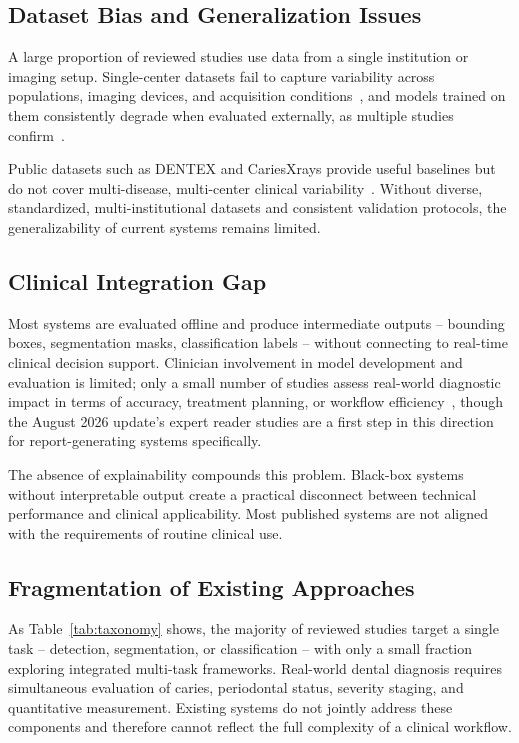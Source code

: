 \documentclass[conference]{IEEEtran}
\begin{document}
\subsection{Dataset Bias and Generalization Issues}

A large proportion of reviewed studies use data from a single
institution or imaging setup. Single-center datasets fail to capture
variability across populations, imaging devices, and acquisition
conditions~\cite{albano2024artificial,luke2025accuracy}, and models
trained on them consistently degrade when evaluated externally, as
multiple studies confirm~\cite{muresanu2024automating}.

Public datasets such as DENTEX and CariesXrays provide useful baselines
but do not cover multi-disease, multi-center clinical
variability~\cite{nassiri2025yolo,chen2024cariesxrays}. Without diverse,
standardized, multi-institutional datasets and consistent validation
protocols, the generalizability of current systems remains limited.

\subsection{Clinical Integration Gap}

Most systems are evaluated offline and produce intermediate outputs --
bounding boxes, segmentation masks, classification labels -- without
connecting to real-time clinical decision support. Clinician involvement
in model development and evaluation is limited; only a small number of
studies assess real-world diagnostic impact in terms of accuracy,
treatment planning, or workflow efficiency~\cite{schwendicke2021cost,lee2025evaluation},
though the August 2026 update's expert reader studies
\cite{zhu2026dentfound,balel2026hybrid} are a first step in this
direction for report-generating systems specifically.

The absence of explainability compounds this problem. Black-box systems
without interpretable output create a practical disconnect between
technical performance and clinical applicability. Most published systems
are not aligned with the requirements of routine clinical use.

\subsection{Fragmentation of Existing Approaches}

As Table~\ref{tab:taxonomy} shows, the majority of reviewed studies
target a single task -- detection, segmentation, or classification --
with only a small fraction exploring integrated multi-task frameworks.
Real-world dental diagnosis requires simultaneous evaluation of caries,
periodontal status, severity staging, and quantitative measurement.
Existing systems do not jointly address these components and therefore
cannot reflect the full complexity of a clinical workflow.
\end{document}
